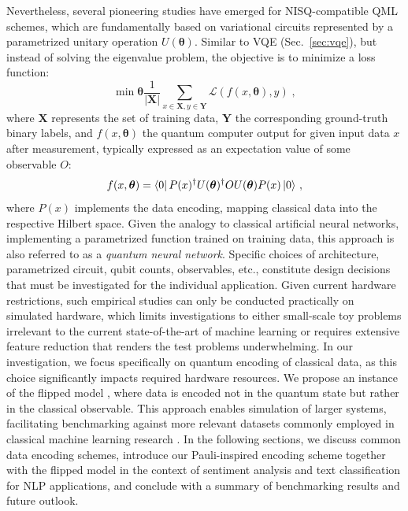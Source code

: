 \documentclass[../main.tex]{subfiles}
\begin{document}
Nevertheless, several pioneering studies have emerged for NISQ-compatible QML schemes, which are fundamentally based on variational circuits \cite{cerezo2021variational} represented by a parametrized unitary operation $U(\bm{\theta})$. Similar to VQE (Sec.~\ref{sec:vqe}), but instead of solving the eigenvalue problem, the objective is to minimize a loss function: 
\begin{equation} 
    \min{\bm{\theta}} \frac{1}{|\bm{X}|} \sum_{x \in \bm{X}, y \in \bm{Y}} \mathcal{L}(f(x,\bm{\theta}),y) \; ,
\end{equation} where $\bm{X}$ represents the set of training data, $\bm{Y}$ the corresponding ground-truth binary labels, and $f(x,\bm{\theta})$ the quantum computer output for given input data $x$ after measurement, typically expressed as an expectation value of some observable $O$:
\begin{equation}
    f(x,\bm{\theta}) = \bra{0}P(x)^\dagger U(\bm{\theta})^\dagger O U(\bm{\theta}) P(x) \ket{0} \, , 
\end{equation} where $P(x)$ implements the data encoding, mapping classical data into the respective Hilbert space. Given the analogy to classical artificial neural networks, implementing a parametrized function trained on training data, this approach is also referred to as a \textit{quantum neural network}. Specific choices of architecture, parametrized circuit, qubit counts, observables, etc., constitute design decisions that must be investigated for the individual application.
Given current hardware restrictions, such empirical studies can only be conducted practically on simulated hardware, which limits investigations to either small-scale toy problems irrelevant to the current state-of-the-art of machine learning or requires extensive feature reduction that renders the test problems underwhelming. In our investigation, we focus specifically on quantum encoding of classical data, as this choice significantly impacts required hardware resources. We propose an instance of the flipped model \cite{Jerbi2024shadows}, where data is encoded not in the quantum state but rather in the classical observable. This approach enables simulation of larger systems, facilitating benchmarking against more relevant datasets commonly employed in classical machine learning research \cite{mnistdataset, xiao2017fashion, krizhevsky2012imagenet, zhang2015agnews, stanford2011imdb, socher2013recursive, wang2019superglue}.
In the following sections, we discuss common data encoding schemes, introduce our Pauli-inspired encoding scheme together with the flipped model in the context of sentiment analysis and text classification for NLP applications, and conclude with a summary of benchmarking results and future outlook.
\end{document}
